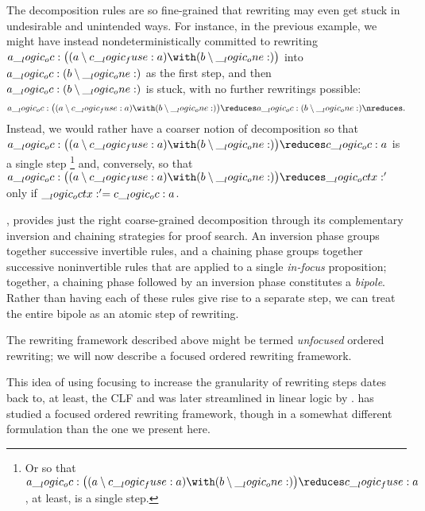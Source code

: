 The decomposition rules are so fine-grained that rewriting may even get stuck in undesirable and unintended ways.
For instance, in the previous example, we might have instead nondeterministically committed to rewriting $a \oc \bigl((a \limp c \fuse a) \with (b \limp \one)\bigr)$ into $a \__logic_oc: (b \mathbin { \setminus } \__logic_one:)$ as the first step, and then $a \__logic_oc: (b \mathbin { \setminus } \__logic_one:)$ is stuck, with no further rewritings possible:
\begin{equation*}
  a \oc \bigl((a \limp c \fuse a) \with (b \limp \one)\bigr)
    \reduces a \oc (b \limp \one)
    \nreduces
    \!\,.
\end{equation*}
Instead, we would rather have a coarser notion of decomposition so that $a \oc \bigl((a \limp c \fuse a) \with (b \limp \one)\bigr) \reduces c \oc a$ is a single step%
\footnote{Or so that $a \oc \bigl((a \limp c \fuse a) \with (b \limp \one)\bigr) \reduces c \fuse a$, at least, is a single step.}
and, conversely, so that $a \oc \bigl((a \limp c \fuse a) \with (b \limp \one)\bigr) \reduces \octx'$ only if $\__logic_octx:' = c \__logic_oc: a$.

 \textcite{Andreoli:JLC92}, provides just the right coarse-grained decomposition through its complementary inversion and chaining strategies for proof search.
An inversion phase groups together successive invertible rules, and a chaining phase groups together successive noninvertible rules that are applied to a single \emph{in-focus} proposition;
together, a chaining phase followed by an inversion phase constitutes a \emph{bipole}.
Rather than having each of these rules give rise to a separate step, we can treat the entire bipole as an atomic step of rewriting.

The rewriting framework described above might be termed \emph{unfocused} ordered rewriting; we will now describe a focused ordered rewriting framework.

This idea of using focusing to increase the granularity of rewriting steps dates back to, at least, the \acf{CLF}\autocites{??}{??} and was later streamlined in linear logic by \textcite{Cervesato+Scedrov:IC09}.
\Textcite{Simmons:CMU12} has studied a focused ordered rewriting framework, though in a somewhat different formulation than the one we present here.


